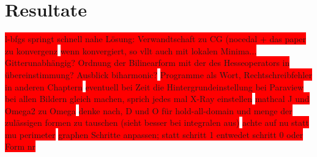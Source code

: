 
\section{Resultate}

\colorbox{red}{l-bfgs springt schnell nahe Lösung: Verwandtschaft zu CG (nocedal + das paper zu konvergenz} \newline
\colorbox{red}{wenn konvergiert, so vllt auch mit lokalen Minima...} \newline
\colorbox{red}{Gitterunabhängig? Ordnung der Bilinearform mit der des Hesseoperators in übereinstimmung? Ausblick biharmonic?} \newline
\colorbox{red}{Programme als Wort, Rechtschreibfehler in anderen Chaptern} \newline
\colorbox{red}{ eventuell bei Zeit die Hintergrundeinstellung bei Paraview bei allen Bildern gleich machen, sprich jedes mal X-Ray einstellen} \newline
\colorbox{red}{mathcal J und Omega2 zu Omega} \newline
\colorbox{red}{denke nach, D und O für hold-all-domain und menge der zulässigen formen zu tauschen (sieht besser bei integralen aus)} \newline
\colorbox{red}{achte auf nu statt mu perimeter} \newline
\colorbox{red}{graphen Schritte anpassen; statt schritt 1 entwedet schritt 0 oder Form nr}

